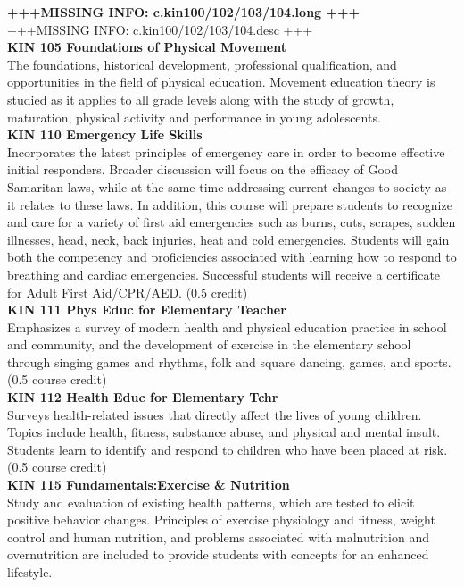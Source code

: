\documentclass[
  letterpaper,
]{scrbook}
\begin{document}
\textbf{+++MISSING INFO: c.kin100/102/103/104.long +++}\\
+++MISSING INFO: c.kin100/102/103/104.desc +++\\
\textbf{KIN 105 Foundations of Physical Movement}\\
The foundations, historical development, professional qualification, and
opportunities in the field of physical education. Movement education
theory is studied as it applies to all grade levels along with the study
of growth, maturation, physical activity and performance in young
adolescents.\\
\textbf{KIN 110 Emergency Life Skills}\\
Incorporates the latest principles of emergency care in order to become
effective initial responders. Broader discussion will focus on the
efficacy of Good Samaritan laws, while at the same time addressing
current changes to society as it relates to these laws. In addition,
this course will prepare students to recognize and care for a variety of
first aid emergencies such as burns, cuts, scrapes, sudden illnesses,
head, neck, back injuries, heat and cold emergencies. Students will gain
both the competency and proficiencies associated with learning how to
respond to breathing and cardiac emergencies. Successful students will
receive a certificate for Adult First Aid/CPR/AED. (0.5 credit)\\
\textbf{KIN 111 Phys Educ for Elementary Teacher}\\
Emphasizes a survey of modern health and physical education practice in
school and community, and the development of exercise in the elementary
school through singing games and rhythms, folk and square dancing,
games, and sports. (0.5 course credit)\\
\textbf{KIN 112 Health Educ for Elementary Tchr}\\
Surveys health-related issues that directly affect the lives of young
children. Topics include health, fitness, substance abuse, and physical
and mental insult. Students learn to identify and respond to children
who have been placed at risk. (0.5 course credit)\\
\textbf{KIN 115 Fundamentals:Exercise \& Nutrition}\\
Study and evaluation of existing health patterns, which are tested to
elicit positive behavior changes. Principles of exercise physiology and
fitness, weight control and human nutrition, and problems associated
with malnutrition and overnutrition are included to provide students
with concepts for an enhanced lifestyle.\\
\end{document}
